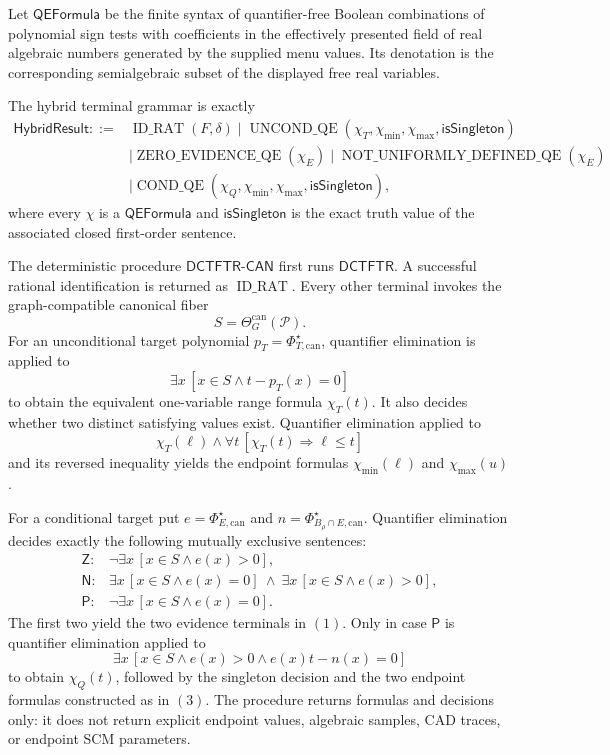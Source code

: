 Let \(\mathsf{QEFormula}\) be the finite syntax of quantifier-free Boolean combinations of polynomial sign tests with coefficients in the effectively presented field of real algebraic numbers generated by the supplied menu values.  Its denotation is the corresponding semialgebraic subset of the displayed free real variables.

The hybrid terminal grammar is exactly
\[
\begin{split}
\mathsf{HybridResult}::={}&
\operatorname{ID\_RAT}(F,\delta)
\mid\operatorname{UNCOND\_QE}(\chi_T,\chi_{\min},\chi_{\max},\mathsf{isSingleton})\\
&\mid\operatorname{ZERO\_EVIDENCE\_QE}(\chi_E)
\mid\operatorname{NOT\_UNIFORMLY\_DEFINED\_QE}(\chi_E)\\
&\mid\operatorname{COND\_QE}(\chi_Q,\chi_{\min},\chi_{\max},\mathsf{isSingleton}),
\end{split}
\tag{1}
\]
where every \(\chi\) is a \(\mathsf{QEFormula}\) and \(\mathsf{isSingleton}\) is the exact truth value of the associated closed first-order sentence.

The deterministic procedure \(\mathsf{DCTFTR\text{-}CAN}\) first runs \(\mathsf{DCTFTR}\).  A successful rational identification is returned as \(\operatorname{ID\_RAT}\).  Every other terminal invokes the graph-compatible canonical fiber
\[
S=\Theta_G^{\mathrm{can}}(\mathcal P).
\]
For an unconditional target polynomial \(p_T=\Phi_{T,\mathrm{can}}^\star\), quantifier elimination is applied to
\[
\exists x\,[x\in S\wedge t-p_T(x)=0]
\tag{2}
\]
to obtain the equivalent one-variable range formula \(\chi_T(t)\).  It also decides whether two distinct satisfying values exist.  Quantifier elimination applied to
\[
\chi_T(\ell)\wedge
\forall t\,[\chi_T(t)\Longrightarrow\ell\leq t]
\tag{3}
\]
and its reversed inequality yields the endpoint formulas \(\chi_{\min}(\ell)\) and \(\chi_{\max}(u)\).

For a conditional target put \(e=\Phi_{E,\mathrm{can}}^\star\) and \(n=\Phi_{B_\rho\cap E,\mathrm{can}}^\star\).  Quantifier elimination decides exactly the following mutually exclusive sentences:
\[
\begin{array}{ll}
\mathsf Z:&\neg\exists x\,[x\in S\wedge e(x)>0],\\
\mathsf N:&\exists x\,[x\in S\wedge e(x)=0]
\ \wedge\ \exists x\,[x\in S\wedge e(x)>0],\\
\mathsf P:&\neg\exists x\,[x\in S\wedge e(x)=0].
\end{array}
\tag{4}
\]
The first two yield the two evidence terminals in \((1)\).  Only in case \(\mathsf P\) is quantifier elimination applied to
\[
\exists x\,[x\in S\wedge e(x)>0\wedge e(x)t-n(x)=0]
\tag{5}
\]
to obtain \(\chi_Q(t)\), followed by the singleton decision and the two endpoint formulas constructed as in \((3)\).  The procedure returns formulas and decisions only: it does not return explicit endpoint values, algebraic samples, CAD traces, or endpoint SCM parameters.